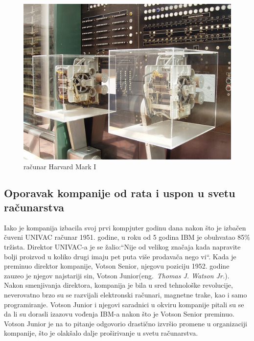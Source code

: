 \documentclass[a4paper]{article}
\begin{document}
\begin{figure}
\begin{center}
\includegraphics[scale=0.75]{HarvardMarkI.jpg}
\end{center}
\caption{računar Harvard Mark I}
\label{fig:HM1}
\end{figure}

\subsection{Oporavak kompanije od rata i uspon u svetu računarstva}%
Iako je kompanija izbacila svoj prvi kompjuter godinu dana nakon što je izbačen čuveni UNIVAC\cite{univac} računar 1951. godine, u roku od 5 godina IBM je obuhvatao 85\% tržista. Direktor UNIVAC-a je se žalio:``Nije od velikog značaja kada napravite bolji proizvod u koliko drugi imaju pet puta više prodavača nego vi``. Kada je preminuo direktor kompanije, Votson Senior, njegovu poziciju 1952. godine zauzeo je njegov najstariji sin, Votson Junior(eng.~{\em Thomas J. Watson Jr.}). Nakon smenjivanja direktora, kompanija je bila u sred tehnološke revolucije, neverovatno brzo su se razvijali elektronski računari, magnetne trake, kao i samo programiranje. Votson Junior i njegovi saradnici u okviru kompanije pitali su se da li su dorasli izazovu vođenja IBM-a nakon što je Votson Senior preminuo. Votson Junior je na to pitanje odgovorio drastično izvršio promene u organizaciji kompanije, što je olakšalo dalje proširivanje u svetu računarstva.
\end{document}
